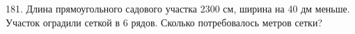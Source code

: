 181. Длина прямоугольного садового участка 2300 см, ширина на 40 дм меньше. Участок оградили сеткой в 6 рядов. Сколько потребовалось метров сетки?\\
